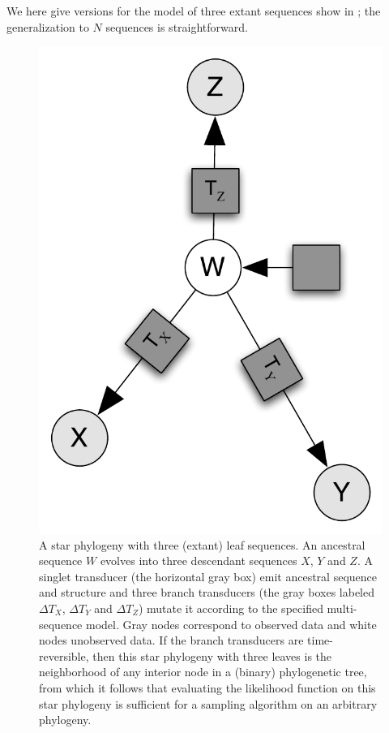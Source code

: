 \documentclass[10pt]{article}
\begin{document}
We here give versions for the model of three extant sequences
show in ; the generalization to $N$ sequences is straightforward.

\begin{figure}[!htb]
  \centering
  \includegraphics [scale=0.4] {figs/threeway.pdf}
  \caption{
    A star phylogeny with three (extant) leaf sequences.
    An ancestral sequence $W$ evolves into three descendant sequences $X$, $Y$ and $Z$.
    A singlet transducer (the horizontal gray box) emit ancestral sequence and structure
    and three branch transducers (the gray boxes labeled $\Delta T_X$, $\Delta T_Y$ and $\Delta T_Z$)
    mutate it according to the specified multi-sequence model.
    Gray nodes correspond to observed data and white nodes unobserved data.
    If the branch transducers are time-reversible, then this star phylogeny with three leaves is
    the neighborhood of any interior node in a (binary) phylogenetic tree, 
    from which it follows that evaluating the likelihood function
    on this star phylogeny is sufficient for a sampling algorithm on an arbitrary phylogeny.
  }
\end{figure}
\end{document}
